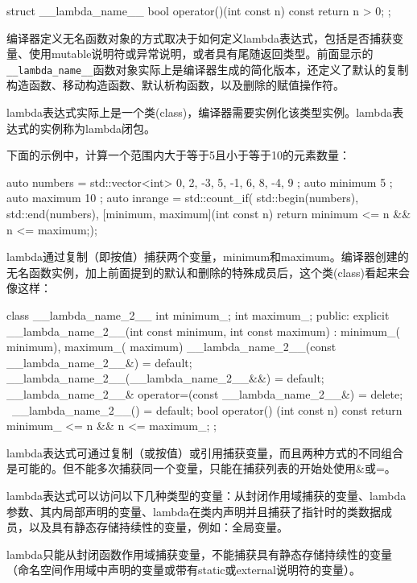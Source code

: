 \begin{cpp}
struct __lambda_name__
{
    bool operator()(int const n) const { return n > 0; }
};
\end{cpp}

编译器定义无名函数对象的方式取决于如何定义lambda表达式，包括是否捕获变量、使用mutable说明符或异常说明，或者具有尾随返回类型。前面显示的\verb|__lambda_name__|函数对象实际上是编译器生成的简化版本，还定义了默认的复制构造函数、移动构造函数、默认析构函数，以及删除的赋值操作符。

\begin{myNotic}
lambda表达式实际上是一个类(class)，编译器需要实例化该类型实例。lambda表达式的实例称为lambda闭包。
\end{myNotic}

下面的示例中，计算一个范围内大于等于5且小于等于10的元素数量：

\begin{cpp}
auto numbers = std::vector<int>{ 0, 2, -3, 5, -1, 6, 8, -4, 9 };
auto minimum { 5 };
auto maximum { 10 };
auto inrange = std::count_if(
    std::begin(numbers), std::end(numbers),
    [minimum, maximum](int const n) {
        return minimum <= n && n <= maximum;});
\end{cpp}

lambda通过复制（即按值）捕获两个变量，minimum和maximum。编译器创建的无名函数实例，加上前面提到的默认和删除的特殊成员后，这个类(class)看起来会像这样：

\begin{cpp}
class __lambda_name_2__
{
    int minimum_;
    int maximum_;
    public:
    explicit __lambda_name_2__(int const minimum, int const maximum) :
    minimum_( minimum), maximum_( maximum)
    {}
    __lambda_name_2__(const __lambda_name_2__&) = default;
    __lambda_name_2__(__lambda_name_2__&&) = default;
    __lambda_name_2__& operator=(const __lambda_name_2__&)
    = delete;
    ~__lambda_name_2__() = default;
    bool operator() (int const n) const
    {
        return minimum_ <= n && n <= maximum_;
    }
};
\end{cpp}

lambda表达式可通过复制（或按值）或引用捕获变量，而且两种方式的不同组合是可能的。但不能多次捕获同一个变量，只能在捕获列表的开始处使用\&或=。

\begin{myNotic}
lambda表达式可以访问以下几种类型的变量：从封闭作用域捕获的变量、lambda参数、其内局部声明的变量、lambda在类内声明并且捕获了指针时的类数据成员，以及具有静态存储持续性的变量，例如：全局变量。

lambda只能从封闭函数作用域捕获变量，不能捕获具有静态存储持续性的变量（命名空间作用域中声明的变量或带有static或external说明符的变量）。
\end{myNotic}

